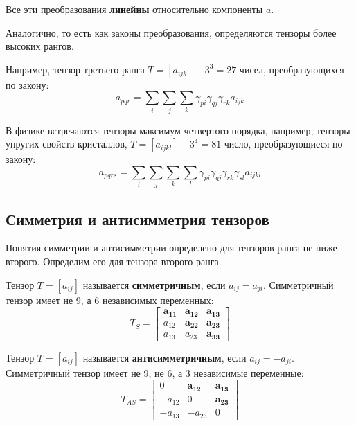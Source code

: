 	Все эти преобразования \textbf{линейны} относительно компоненты \( a \).
	
	Аналогично, то есть как законы преобразования, определяются тензоры более высоких рангов.
	
	Например, тензор третьего ранга \( T = [a_{ijk}] \) -- \( 3^3 = 27 \) чисел, преобразующихся по закону:
	\begin{equation}
		a_{pqr} = \sum\limits_i\sum\limits_j\sum\limits_k \gamma_{pi}\gamma_{qj}\gamma_{rk} a_{ijk}
	\end{equation}
	
	В физике встречаются тензоры максимум четвертого порядка, например, тензоры упругих свойств кристаллов,  \( T = [a_{ijkl}] \) -- \( 3^4 = 81 \) число, преобразующиеся по закону:
	\begin{equation}
		a_{pqrs} = \sum\limits_i\sum\limits_j\sum\limits_k\sum\limits_l \gamma_{pi}\gamma_{qj}\gamma_{rk}\gamma_{sl} a_{ijkl}
	\end{equation}
	
\subsection{Симметрия и антисимметрия тензоров}

	Понятия симметрии и антисимметрии определено для тензоров ранга не ниже второго. Определим его для тензора второго ранга.
	
	\begin{definition}
	Тензор \( T = [a_{ij}] \) называется \textbf{симметричным}, если \( a_{ij} = a_{ji} \). Симметричный тензор имеет не 9, а 6 независимых переменных:
	\[ T_S = \begin{bmatrix}
		\mathbf{a_{11}}	& \mathbf{a_{12}}	& \mathbf{a_{13}} \\
		a_{12}			& \mathbf{a_{22}}	& \mathbf{a_{23}} \\
		a_{13}			& a_{23}			& \mathbf{a_{33}}
	\end{bmatrix} \]
	\end{definition}
	
	\begin{definition}
	Тензор \( T = [a_{ij}] \) называется \textbf{антисимметричным}, если \( a_{ij} = -a_{ji} \). Симметричный тензор имеет не 9, не 6, а 3 независимые переменные:
	\[ T_{AS} = \begin{bmatrix}
		0 		& \mathbf{a_{12}}	& \mathbf{a_{13}} \\
		-a_{12}	& 0				& \mathbf{a_{23}} \\
		-a_{13}	& -a_{23}			& 0
	\end{bmatrix} \]
	\end{definition}
	
